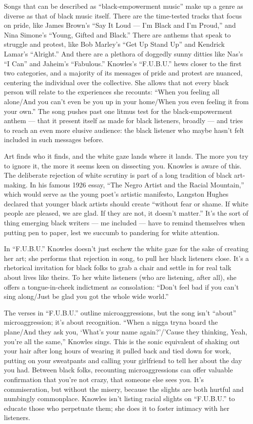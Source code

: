 Songs that can be described as ``black-empowerment music'' make up a
genre as diverse as that of black music itself. There are the
time-tested tracks that focus on pride, like James Brown's ``Say It Loud
--- I'm Black and I'm Proud,'' and Nina Simone's ``Young, Gifted and
Black.'' There are anthems that speak to struggle and protest, like Bob
Marley's ``Get Up Stand Up'' and Kendrick Lamar's ``Alright.'' And there
are a plethora of doggedly sunny ditties like Nas's ``I Can'' and
Jaheim's ``Fabulous.'' Knowles's ``F.U.B.U.'' hews closer to the first
two categories, and a majority of its messages of pride and protest are
nuanced, centering the individual over the collective. She allows that
not every black person will relate to the experiences she recounts:
``When you feeling all alone/And you can't even be you up in your
home/When you even feeling it from your own.'' The song pushes past one
litmus test for the black-empowerment anthem --- that it present itself
as made for black listeners, broadly --- and tries to reach an even more
elusive audience: the black listener who maybe hasn't felt included in
such messages before.

Art finds who it finds, and the white gaze lands where it lands. The
more you try to ignore it, the more it seems keen on dissecting you.
Knowles is aware of this. The deliberate rejection of white scrutiny is
part of a long tradition of black art-making. In his famous 1926 essay,
``The Negro Artist and the Racial Mountain,'' which would serve as the
young poet's artistic manifesto, Langston Hughes declared that younger
black artists should create ``without fear or shame. If white people are
pleased, we are glad. If they are not, it doesn't matter.'' It's the
sort of thing emerging black writers --- me included --- have to remind
themselves when putting pen to paper, lest we succumb to pandering for
white attention.

In ``F.U.B.U.'' Knowles doesn't just eschew the white gaze for the sake
of creating her art; she performs that rejection in song, to pull her
black listeners close. It's a rhetorical invitation for black folks to
grab a chair and settle in for real talk about lives like theirs. To her
white listeners (who are listening, after all), she offers a
tongue-in-cheek indictment as consolation: ``Don't feel bad if you can't
sing along/Just be glad you got the whole wide world.''

The verses in ``F.U.B.U.'' outline microaggressions, but the song isn't
``about'' microaggression; it's about recognition. ``When a nigga tryna
board the plane/And they ask you, `What's your name again?'/'Cause they
thinking, Yeah, you're all the same,'' Knowles sings. This is the sonic
equivalent of shaking out your hair after long hours of wearing it
pulled back and tied down for work, putting on your sweatpants and
calling your girlfriend to tell her about the day you had. Between black
folks, recounting microaggressions can offer valuable confirmation that
you're not crazy, that someone else sees you. It's commiseration, but
without the misery, because the slights are both hurtful and numbingly
commonplace. Knowles isn't listing racial slights on ``F.U.B.U.'' to
educate those who perpetuate them; she does it to foster intimacy with
her listeners.

